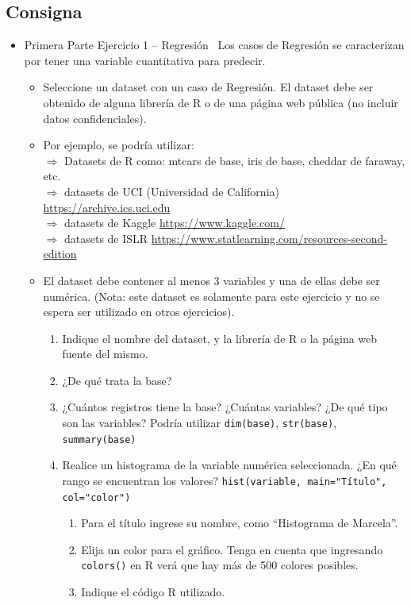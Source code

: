 %

%
%
\subsection{Consigna}
\begin{itemize}
\item Primera Parte Ejercicio 1 – Regresión \
Los casos de Regresión se caracterizan por tener una variable cuantitativa para predecir.
\begin{itemize}
\item Seleccione un dataset con un caso de Regresión. El dataset debe ser obtenido de alguna librería de R o de una página web pública (no incluir datos confidenciales).
\item Por ejemplo, se podría utilizar:\\
$\Longrightarrow$ Datasets de R como: mtcars de base, iris de base, cheddar de faraway, etc.\\
$\Longrightarrow$ datasets de UCI (Universidad de California) \url{https://archive.ics.uci.edu}\\
$\Longrightarrow$ datasets de Kaggle \url{https://www.kaggle.com/}\\
$\Longrightarrow$ datasets de ISLR \url{https://www.statlearning.com/resources-second-edition}\\
\item El dataset debe contener al menos 3 variables y una de ellas debe ser numérica. (Nota: este dataset es solamente para este ejercicio y no se espera ser utilizado en otros ejercicios).
\begin{enumerate}
\item Indique el nombre del dataset, y la librería de R o la página web fuente del mismo.
\item ¿De qué trata la base?
\item ¿Cuántos registros tiene la base? ¿Cuántas variables? ¿De qué tipo son las variables? Podría utilizar \texttt{dim(base)}, \texttt{str(base)}, \texttt{summary(base)}
\item Realice un histograma de la variable numérica seleccionada. ¿En qué rango se encuentran los valores? \texttt{hist(variable, main="Título", col="color")}
\begin{enumerate}
\item Para el título ingrese su nombre, como “Histograma de Marcela”.
\item Elija un color para el gráfico. Tenga en cuenta que ingresando \texttt{colors()} en R verá que hay más de 500 colores posibles.
\item Indique el código R utilizado.
\end{enumerate}
\end{enumerate}
\end{itemize}
\end{itemize}
\newpage
